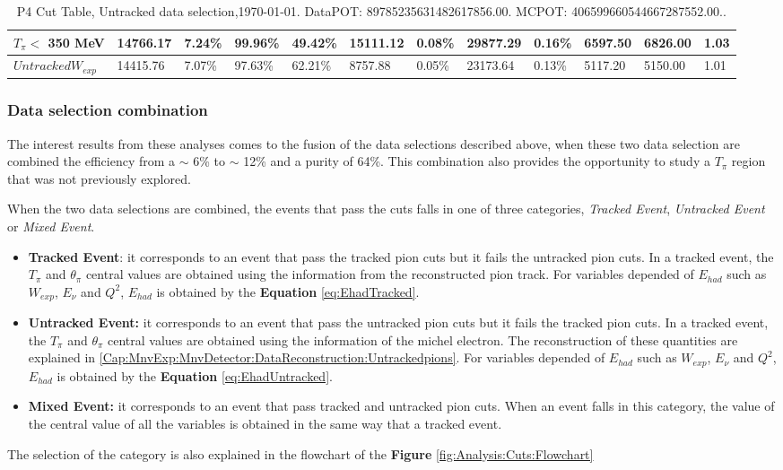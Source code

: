 \begin{table}
\begin{tabular}{|*{12}{l|}}
 $T_\pi<$ 350 MeV   & 14766.17     &   7.24\% &  99.96\% &  49.42\% & 15111.12 &   0.08\% & 29877.29     &   0.16\% & 6597.50     & 6826.00 &   1.03 \\ \hline
 $Untracked W_{exp}$   & 14415.76     &   7.07\% &  97.63\% &  62.21\% & 8757.88 &   0.05\% & 23173.64     &   0.13\% & 5117.20     & 5150.00 &   1.01 \\ \hline
    \end{tabular}
    \caption{P4 Cut Table, Untracked data selection,\today. DataPOT: 89785235631482617856.00. MCPOT: 406599660544667287552.00..}
    \label{tab:Analysis:Cuts:UntrackedCutTable}
\end{table}

\pagebreak

\subsubsection{Data selection combination}

The interest results from these analyses comes to the fusion of the data selections described above, when these two data selection are combined the efficiency from a \(\sim\) 6\% to \(\sim\) 12\% and a purity of 64\%. This combination also provides the opportunity to study a $T_\pi$ region that was not previously explored. 

When the two data selections are combined, the events that pass the cuts falls in one of three categories, \textit{Tracked Event}, \textit{Untracked Event} or \textit{Mixed Event}.
\begin{itemize}
    \item \textbf{Tracked Event}: it corresponds to an event that pass the tracked pion cuts but it fails the untracked pion cuts. In a tracked event, the $T_\pi$ and $\theta_\pi$ central values are obtained using the information from the reconstructed pion track. For variables depended of $E_{had}$ such as $W_{exp}$, $E_\nu$ and $Q^2$, $E_{had}$ is obtained by the \textbf{Equation} \ref{eq:EhadTracked}.
    \item \textbf{Untracked Event:} it corresponds to an event that pass the untracked pion cuts but it fails the tracked pion cuts. In a tracked event, the $T_\pi$ and $\theta_\pi$ central values are obtained using the information of the michel electron. The reconstruction of these quantities are explained in \ref{Cap:MnvExp:MnvDetector:DataReconstruction:Untrackedpions}. For variables depended of $E_{had}$ such as $W_{exp}$, $E_\nu$ and $Q^2$, $E_{had}$ is obtained by the \textbf{Equation} \ref{eq:EhadUntracked}.
    \item  \textbf{Mixed Event:} it corresponds to an event that pass tracked and untracked pion cuts. When an event falls in this category, the value of the central value of all the variables is obtained in the same way that a tracked event. 
\end{itemize}
The selection of the category is also explained in the flowchart of the \textbf{Figure} \ref{fig:Analysis:Cuts:Flowchart} 

